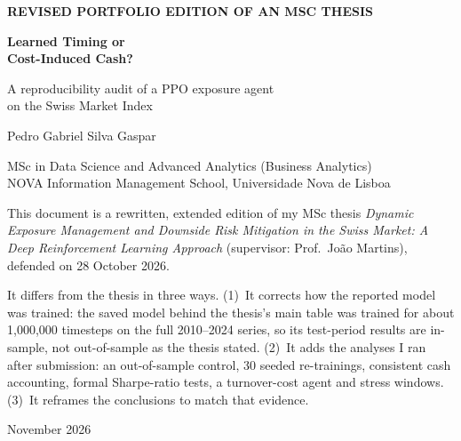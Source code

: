 \documentclass[11pt,a4paper]{article}
\begin{document}
\begin{titlepage}
\vspace*{2.5cm}
{\sffamily\small\color{accent}\bfseries REVISED PORTFOLIO EDITION OF AN MSC THESIS}\par\vspace{0.8em}
{\sffamily\fontsize{24}{29}\selectfont\bfseries\color{navy} Learned Timing or\\Cost-Induced Cash?\par}
\vspace{0.6em}
{\sffamily\Large A reproducibility audit of a PPO exposure agent\\on the Swiss Market Index\par}
\vspace{2.2cm}
{\large Pedro Gabriel Silva Gaspar\par}
\vspace{0.3em}
{\small MSc in Data Science and Advanced Analytics (Business Analytics)\\
NOVA Information Management School, Universidade Nova de Lisboa\par}
\vspace{2.2cm}
\begin{keybox}
\small
This document is a rewritten, extended edition of my MSc thesis \emph{Dynamic Exposure Management and Downside Risk Mitigation in the Swiss Market: A Deep Reinforcement Learning Approach} (supervisor: Prof.\ João Martins), defended on 28 October 2026.

It differs from the thesis in three ways. (1)~It corrects how the reported model was trained: the saved model behind the thesis's main table was trained for about 1,000,000 timesteps on the full 2010--2024 series, so its test-period results are in-sample, not out-of-sample as the thesis stated. (2)~It adds the analyses I ran after submission: an out-of-sample control, 30 seeded re-trainings, consistent cash accounting, formal Sharpe-ratio tests, a turnover-cost agent and stress windows. (3)~It reframes the conclusions to match that evidence.
\end{keybox}
\vfill
{\small\color{gray} November 2026}
\end{titlepage}
\end{document}
